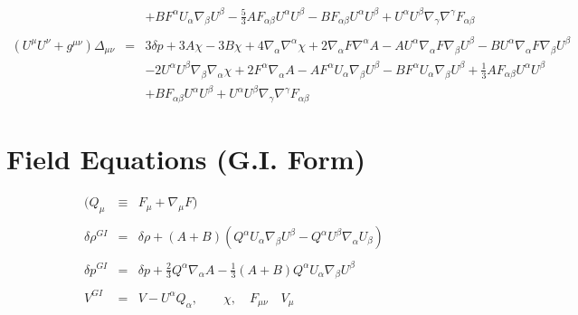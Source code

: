 \documentclass[10pt,letterpaper]{article}
\numberwithin{equation}{section}
\begin{document}
\begin{eqnarray}
&& + B F^{\alpha } U_{\alpha } \nabla_{\beta }U^{\beta }- \tfrac{5}{3} A F_{\alpha \beta } U^{\alpha } U^{\beta } -  B F_{\alpha \beta } U^{\alpha } U^{\beta } + U^{\alpha } U^{\beta } \nabla_{\gamma }\nabla^{\gamma }F_{\alpha \beta }
\\  \nonumber\\ 
(U^\mu U^\nu+g^{\mu\nu})\Delta_{\mu\nu}&=& 3 \delta p + 3 A \chi - 3 B \chi + 4 \nabla_{\alpha }\nabla^{\alpha }\chi + 2 \nabla_{\alpha }F \nabla^{\alpha }A -  A U^{\alpha } \nabla_{\alpha }F \nabla_{\beta }U^{\beta } -  B U^{\alpha } \nabla_{\alpha }F \nabla_{\beta }U^{\beta } \nonumber \\ 
&& - 2 U^{\alpha } U^{\beta } \nabla_{\beta }\nabla_{\alpha }\chi +2 F^{\alpha } \nabla_{\alpha }A -  A F^{\alpha } U_{\alpha } \nabla_{\beta }U^{\beta } -  B F^{\alpha } U_{\alpha } \nabla_{\beta }U^{\beta }+\tfrac{1}{3} A F_{\alpha \beta } U^{\alpha } U^{\beta } \nonumber \\ 
&& + B F_{\alpha \beta } U^{\alpha } U^{\beta } + U^{\alpha } U^{\beta } \nabla_{\gamma }\nabla^{\gamma }F_{\alpha \beta }
\end{eqnarray}
%
%
%
\newpage
\section{Field Equations (G.I. Form)}
%
\begin{eqnarray}
(Q_\mu  &\equiv& F_\mu + \nabla_\mu F)
\\ \nonumber\\
\delta \rho^{GI}{} &=& \delta \rho+ (A + B)( Q^{\alpha } U_{\alpha } \nabla_{\beta }U^{\beta }-Q^{\alpha } U^{\beta } \nabla_{\alpha }U_{\beta })
\label{rhogi}
\\ \nonumber\\
\delta p^{GI}{} &=& \delta p + \tfrac{2}{3} Q^{\alpha } \nabla_{\alpha }A -  \tfrac{1}{3} (A+B) Q^{\alpha } U_{\alpha } \nabla_{\beta }U^{\beta } 
\label{pgi}
\\ \nonumber\\
V^{GI}&=& V-U^\alpha Q_\alpha,\qquad \chi,\quad F_{\mu\nu}\quad V_\mu
\end{eqnarray}
%
%
\end{document}
